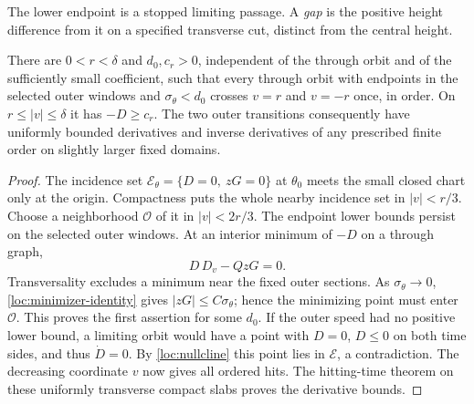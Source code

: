 The lower endpoint is a stopped limiting passage. A \emph{gap} is the
positive height difference from it on a specified transverse cut,
distinct from the central height.

\begin{lemma}\label{lem:loc-stopped-passage}
There are \(0<r<\delta\) and \(d_0,c_r>0\), independent of the
through orbit and of the sufficiently small coefficient, such that
every through orbit with endpoints in the selected outer windows and
\(\sigma_\theta<d_0\) crosses \(v=r\) and \(v=-r\) once, in order.
On \(r\le |v|\le\delta\) it has \(-D\ge c_r\).
The two outer transitions consequently have uniformly bounded
derivatives and inverse derivatives of any prescribed finite order
on slightly larger fixed domains.
\end{lemma}
\begin{proof}
The incidence set
\(\mathcal E_\theta=\{D=0,\ zG=0\}\) at \(\theta_0\) meets the
small closed chart only at the origin. Compactness puts the whole
nearby incidence set in \(|v|<r/3\).
Choose a neighborhood \(\mathcal O\) of it in \(|v|<2r/3\).
The endpoint lower bounds persist on the selected outer windows.
At an interior minimum of \(-D\) on a through graph,
\begin{equation}\label{loc:minimizer-identity}
 D\,D_v-QzG=0 .
\end{equation}
Transversality excludes a minimum near the fixed outer sections.
As \(\sigma_\theta\to0\), \eqref{loc:minimizer-identity} gives
\(|zG|\le C\sigma_\theta\); hence the minimizing point must enter
\(\mathcal O\). This proves the first assertion for some \(d_0\).
If the outer speed had no positive lower bound, a limiting orbit
would have a point with \(D=0\), \(D\le0\) on both time sides,
and thus \(\dot D=0\). By \eqref{loc:nullcline} this point lies
in \(\mathcal E\), a contradiction. The decreasing coordinate \(v\)
now gives all ordered hits. The hitting-time theorem on these
uniformly transverse compact slabs proves the derivative bounds.
\end{proof}

